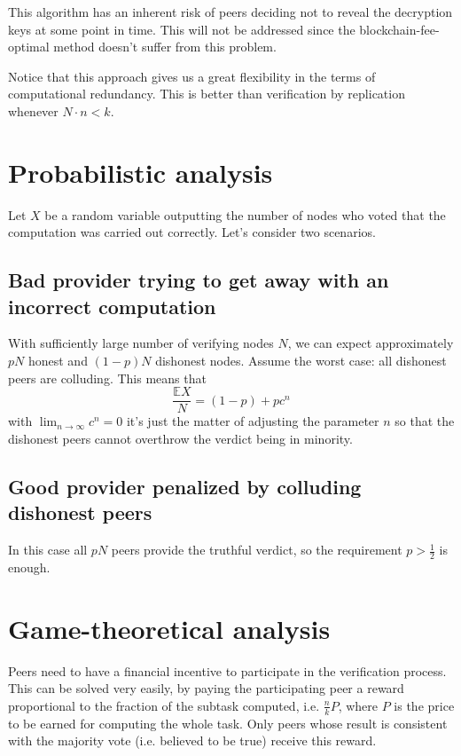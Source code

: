 \documentclass[12pt]{article}
\begin{document}
This algorithm has an inherent risk of peers deciding not to reveal the decryption keys at some point in time. 
This will not be addressed since the blockchain-fee-optimal method doesn't suffer from this problem.

Notice that this approach gives us a great flexibility in the terms of computational redundancy. This is better than verification by replication whenever $N \cdot n < k$.

\section{Probabilistic analysis}
Let $X$ be a random variable outputting the number of nodes who voted that the computation was carried out correctly.
Let's consider two scenarios. 
\subsection{Bad provider trying to get away with an incorrect computation}
With sufficiently large number of verifying nodes $N$, we can expect approximately $pN$ honest and $(1-p)N$ dishonest nodes. 
Assume the worst case: all dishonest peers are colluding. This means that 
\begin{equation}
\frac{\mathbb{E}X}{N} = (1-p) + pc^n
\end{equation}
with $\lim_{n\to\infty} c^n = 0$ it's just the matter of adjusting the parameter $n$ so that the dishonest peers cannot overthrow the verdict being in minority.

\subsection{Good provider penalized by colluding dishonest peers}
In this case all $pN$ peers provide the truthful verdict, so the requirement $p > \frac{1}{2}$ is enough.

\section{Game-theoretical analysis} 
Peers need to have a financial incentive to participate in the verification process.
This can be solved very easily, by paying the participating peer a reward proportional
to the fraction of the subtask computed, i.e. $\frac{n}{k} P$, where $P$ is the price
to be earned for computing the whole task. Only peers whose result is consistent with
the majority vote (i.e. believed to be true) receive this reward.
\end{document}
